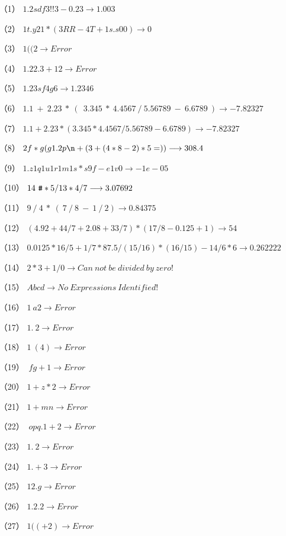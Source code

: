 \documentclass{ctexart}
\begin{document}
\begin{itemize}
    \item[（1）]$1.2sdf3!!3-0.23\longrightarrow 1.003$
    \item[（2）]$1t.y21*(3RR-4T+1s.s00)\longrightarrow 0$
    \item[（3）]$1((2\longrightarrow Error$
    \item[（4）]$1.22.3+12\longrightarrow Error$
    \item[（5）]$1.23sf4g6  \longrightarrow 1.2346$
    \item[（6）]$1.1\ +\ 2.23\ *\ (\ \ 3.345\ *\ 4.4567\ /\ 5.56789\ -\ 6.6789\ ) \longrightarrow -7.82327$
    \item[（7）]$1.1+2.23*(3.345*4.4567/5.56789-6.6789)\longrightarrow -7.82327$
    \item[（8）]$2f*g(g1.2p\verb|\n|+(3+(4*8-2)*5=))\longrightarrow 308.4$
    \item[（9）]$1.z1q1u1r1m1s*s9f-e1v0\longrightarrow -1e-05$
    \item[（10）]$14\ \verb|#|*5/13*4/7\longrightarrow 3.07692$
    \item[（11）]$9\ /\ 4\ *\ (\ 7\ /\ 8\ -\ 1\ /\ 2 )\longrightarrow 0.84375$
    \item[（12）]$(4.92+44/7+2.08+33/7)*(17/8-0.125+1)\longrightarrow 54$
    \item[（13）]$0.0125*16/5+1/7*87.5/(15/16)*(16/15)-14/6*6\longrightarrow 0.262222$
    \item[（14）]$2*3+1/0\longrightarrow Can\ not\ be\ divided\ by\ zero!$
    \item[（15）]$Abcd\longrightarrow No\ Expressions\ Identified!$ 
    \item[（16）]$1\ a2\longrightarrow Error$
    \item[（17）]$1.\ 2\longrightarrow Error$
    \item[（18）]$1\ (4)\longrightarrow Error$
    \item[（19）]$\ fg+1\longrightarrow Error$
    \item[（20）]$1+z*2\longrightarrow Error$
    \item[（21）]$1+mn\longrightarrow Error$
    \item[（22）]$\ opq.1+2\longrightarrow Error$
    \item[（23）]$1.\ 2\longrightarrow Error$
    \item[（24）]$1.+3\longrightarrow Error$
    \item[（25）]$12.g\longrightarrow Error$
    \item[（26）]$1.2.2\longrightarrow Error$
    \item[（27）]$1((+2)\longrightarrow Error$
\end{itemize}
\end{document}
